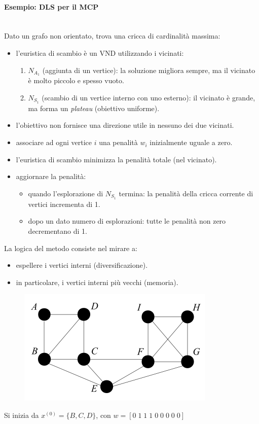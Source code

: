 \documentclass{article}
\begin{document}
\paragraph{Esempio: DLS per il MCP}\mbox{}\\
Dato un grafo non orientato, trova una cricca di cardinalità massima:
\begin{itemize}
    \item l'euristica di scambio è un VND utilizzando i vicinati:
    \begin{enumerate}
        \item $N_{A_1}$ (aggiunta di un vertice): la soluzione migliora sempre, ma il vicinato
        è molto piccolo e spesso vuoto.
        \item $N_{S_1}$ (scambio di un vertice interno con uno esterno): il vicinato è grande,
        ma forma un \textit{plateau} (obiettivo uniforme).
    \end{enumerate}

    \item l'obiettivo non fornisce una direzione utile in nessuno dei due vicinati.
    \item associare ad ogni vertice $i$ una penalità $w_i$ inizialmente uguale a zero.
    \item l'euristica di scambio minimizza la penalità totale (nel vicinato).
    \item aggiornare la penalità:
    \begin{itemize}
        \item quando l'esplorazione di $N_{S_1}$ termina: la penalità della cricca corrente di
        vertici incrementa di 1.
        \item dopo un dato numero di esplorazioni: tutte le penalità non zero decrementano di 1.
    \end{itemize}
\end{itemize}
La logica del metodo consiste nel mirare a:
\begin{itemize}
    \item espellere i vertici interni (diversificazione).
    \item in particolare, i vertici interni più vecchi (memoria).
\end{itemize}

\begin{figure}[H]
    \centering
    \includegraphics[scale=0.5]{images/MCP_ex1.png}
\end{figure}
Si inizia da $x^{(0)}=\{B,C,D\}$, con $w=[0\;1\;1\;1\;0\;0\;0\;0\;0]$
\end{document}
